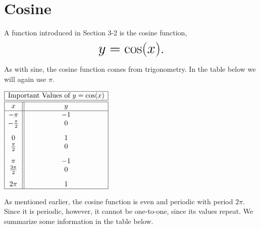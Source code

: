 \documentclass[nooutcomes]{ximera}
\begin{document}

\section{Cosine}
A function introduced in Section 3-2 is the cosine function, $$ \mbox{\huge $y=\cos(x)$.}$$ 


As with sine, the cosine function comes from trigonometry. In the table below we will again use $\pi$.

\begin{image}
\end{image}

\begin{center}
\(
\begin{array}{ |c || c|  }
 \hline
 \multicolumn{2}{|c|}{\text{\normalfont Important Values of } y=\cos(x)} \\
\hline
 \hline
 x & y\\
 \hline

 -\pi&-1\\

 -\frac{\pi}{2}&0\\[2ex]

 0&1\\

 \frac{\pi}{2}&0\\[2ex]

 \pi&-1\\

\frac{3\pi}{2}&0\\[2ex]

 2 \pi&1\\
\hline
\end{array}
\)
\end{center} 

As mentioned earlier, the cosine function is even and periodic with period $2\pi$. Since it is periodic, however, it cannot be one-to-one, since its values repeat. We summarize some information in the table below.
\end{document}

